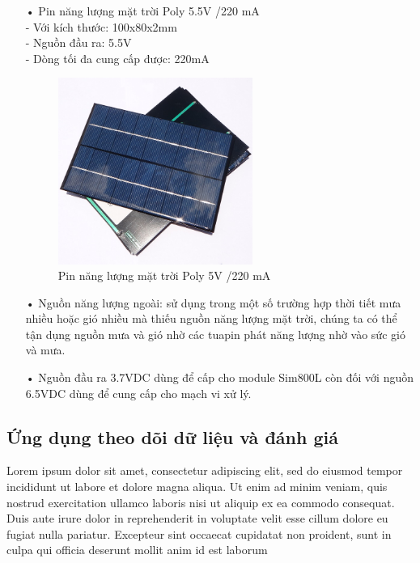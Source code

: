 \begin{itemize}
\item[•]Pin năng lượng mặt trời Poly 5.5V /220 mA\\
-	Với kích thước: 100x80x2mm\\
-	Nguồn đầu ra: 5.5V\\
-	Dòng tối đa cung cấp được: 220mA\\
\begin{figure}[H]
\centering    
\includegraphics[width=0.6\textwidth]{solarpanel_real}
\caption[Pin năng lượng mặt trời Poly 5V /220 mA]{Pin năng lượng mặt trời Poly 5V /220 mA}
\label{fig:solarpanel_real}
\end{figure}

\item[•]Nguồn năng lượng ngoài: sử dụng trong một số trường hợp thời tiết mưa nhiều hoặc gió nhiều mà thiếu nguồn năng lượng mặt trời, chúng ta có thể tận dụng nguồn mưa và gió nhờ các tuapin phát năng lượng nhờ vào sức gió và mưa.
\item[•] Nguồn đầu ra 3.7VDC dùng để cấp cho module Sim800L còn đối với nguồn 6.5VDC dùng để cung cấp cho mạch vi xử lý.
\end{itemize}














\subsection{Ứng dụng theo dõi dữ liệu và đánh giá}
Lorem ipsum dolor sit amet, consectetur adipiscing elit, sed do eiusmod tempor incididunt ut labore et dolore magna aliqua. Ut enim ad minim veniam, quis nostrud exercitation ullamco laboris nisi ut aliquip ex ea commodo consequat. Duis aute irure dolor in reprehenderit in voluptate velit esse cillum dolore eu fugiat nulla pariatur. Excepteur sint occaecat cupidatat non proident, sunt in culpa qui officia deserunt mollit anim id est laborum
